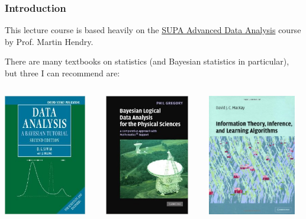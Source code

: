 \begin{frame}

\frametitle{Introduction}
\label{introduction}

This lecture course is based heavily on the \href{http://www.astro.gla.ac.uk/users/martin/supa-da.html}{SUPA Advanced Data Analysis} course by Prof. Martin Hendry. 

There are many textbooks on statistics (and Bayesian statistics in particular), but three I can
recommend are:

\begin{columns}
\begin{column}{0.33\textwidth}

\includegraphics[keepaspectratio,width=\textwidth,height=150pt]{figures/sivia.jpg}
\end{column}
\begin{column}{0.33\textwidth}
\includegraphics[keepaspectratio,width=\textwidth,height=150pt]{figures/gregory.jpg}
\end{column}
\begin{column}{0.33\textwidth}
\includegraphics[keepaspectratio,width=\textwidth,height=150pt]{figures/mackay.jpg}
\end{column}
\end{columns}

\end{frame}

